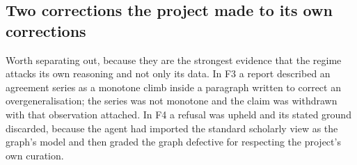 \subsection{Two corrections the project made to its own corrections}

Worth separating out, because they are the strongest evidence that the regime
attacks its own reasoning and not only its data. In F3 a report described an
agreement series as a monotone climb inside a paragraph written to correct an
overgeneralisation; the series was not monotone and the claim was withdrawn with that
observation attached. In F4 a refusal was upheld and its stated ground discarded,
because the agent had imported the standard scholarly view as the graph's model and
then graded the graph defective for respecting the project's own curation.
